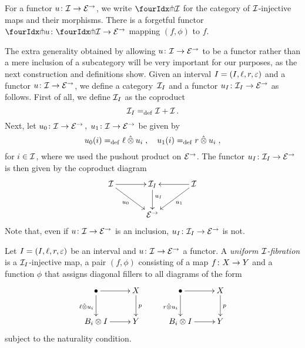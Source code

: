 \documentclass[reqno,10pt,a4paper,oneside]{amsart}
\begin{document}
For a functor $u \co \cal{I} \to \catE^\to$, we write $\liftr{\cal{I}}$ for the category  of 
$\cal{I}$-injective maps and their morphisms. There is a forgetful functor~$\liftr{u} \co \liftr{\cal{I}} \to \catE^\to$
mapping $(f, \phi)$ to $f$.

\medskip

The extra generality obtained by allowing $u \co \cal{I} \to \catE^\to$ to be a functor rather than a mere 
inclusion of a  subcategory will be very important for our purposes, as the next construction and definitions
show. Given an interval $\interval = (\interval, \intervall, \intervalr, \varepsilon)$ and a functor $u \co \cal{I} \to \catE^\to$,
we define a category~$\cal{I}_\interval$ and a functor $u_\interval \co \cal{I}_\interval \to \catE^\to$ as follows. First of all, we define $\cal{I}_\interval$ as the coproduct
 \[
 \cal{I}_\interval  \defeq \cal{I} + \cal{I} \, .
 \] 
 Next, let $u_{0} \co \cal{I} \to \catE^\to \, , \; u_{1} \co \cal{I} \to \catE^\to$ be given by
 \[
u_{0}(i) \defeq  \intervall \hatotimes u_i \; , \quad
u_{1}(i) \defeq  \intervalr \hatotimes u_i \; , 
\]
for $i \in \cal{I}$, where we used the pushout product on $\catE^\to$. The functor $u_\interval \co \cal{I}_\interval \to \catE^\to$ is then given by the coproduct diagram
\begin{equation}
\label{equ:u-interval}
\vcenter{\hbox{\xymatrix@C=1.2cm{
\cal{I} \ar[r] \ar[dr]_-{u_0} & \cal{I}_\interval \ar[d]^(.4){u_\interval} & \cal{I} \ar[dl]^-{u_1} \ar[l] \\ 
 & \catE^\to }}}
\end{equation}
Note that, even if $u \co \cal{I} \to \catE^\to$ is an inclusion, $u_\interval \co \cal{I}_\interval \to \catE^\to$ is not.


\begin{definition} \label{A-fibration} Let  $\interval = (\interval, \intervall, \intervalr,\varepsilon)$ be an interval and
 $u \co \cal{I} \to \catE^\to$ a functor. A \emph{uniform $\cal{I}$-fibration} is a $\cal{I}_\interval$-injective map,
 \ie a pair $(f, \phi)$ consisting of a map $f \co X \to Y$ and a function $\phi$ that assigns diagonal fillers to all diagrams of the form
\[
\xymatrix{
\bullet \ar[r] \ar[d]_{\intervall \hatotimes u_i} & X \ar[d]^p \\
B_i \otimes \interval \ar[r] & Y} \qquad \xymatrix{
\bullet \ar[r] \ar[d]_{\intervalr \hatotimes u_i} & X \ar[d]^p \\
B_i \otimes \interval \ar[r] & Y}
\]
subject to the naturality condition.
\end{definition}
\end{document}

